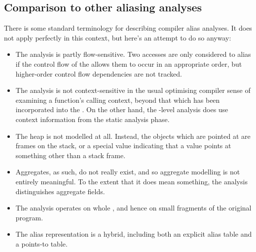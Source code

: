 \subsection{Comparison to other aliasing analyses}



There is some standard terminology for describing compiler alias
analyses.  It does not apply perfectly in
this context, but here's an attempt to do so anyway:

\begin{itemize}
\item
  The analysis is partly flow-sensitive.  Two accesses are only
  considered to alias if the control flow of the {\StateMachine}
  allows them to occur in an appropriate order, but higher-order
  control flow dependencies are not tracked.  
\item
  The analysis is not context-sensitive in the usual optimising
  compiler sense of examining a function's calling context, beyond
  that which has been incorporated into the {\StateMachine}.  On the
  other hand, the {\StateMachine}-level analysis does use context
  information from the static analysis phase.
\item
  The heap is not modelled at all.  Instead, the objects which are
  pointed at are frames on the stack, or a special value indicating
  that a value points at something other than a stack frame.
\item
  Aggregates, as such, do not really exist, and so aggregate modelling
  is not entirely meaningful.  To the extent that it does mean
  something, the analysis distinguishes aggregate fields.
\item
  The analysis operates on whole {\StateMachines}, and hence on small
  fragments of the original program.
\item
  The alias representation is a hybrid, including both an explicit
  alias table and a points-to table. 
\end{itemize}

